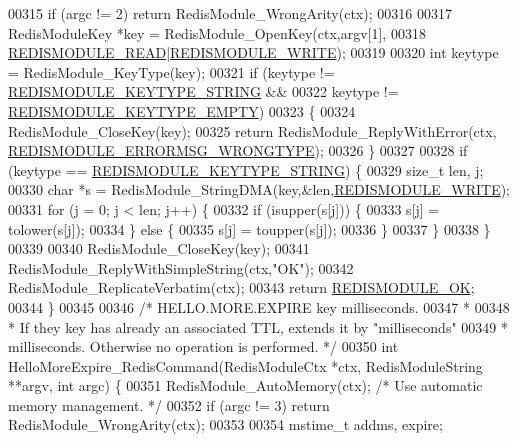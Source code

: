 \begin{DoxyCode}
00315     \textcolor{keywordflow}{if} (argc != 2) \textcolor{keywordflow}{return} RedisModule\_WrongArity(ctx);
00316 
00317     RedisModuleKey *key = RedisModule\_OpenKey(ctx,argv[1],
00318         \hyperlink{redismodule_8h_a369d2ff4bca768b05f826a12dd694825}{REDISMODULE\_READ}|\hyperlink{redismodule_8h_a73b37117ef94cb4a904361afcc51b6b4}{REDISMODULE\_WRITE});
00319 
00320     \textcolor{keywordtype}{int} keytype = RedisModule\_KeyType(key);
00321     \textcolor{keywordflow}{if} (keytype != \hyperlink{redismodule_8h_aa95428eed7110a77736ddbe0584aebbf}{REDISMODULE\_KEYTYPE\_STRING} &&
00322         keytype != \hyperlink{redismodule_8h_adf2819748eb5e89c621d2c9c65c0b5f7}{REDISMODULE\_KEYTYPE\_EMPTY})
00323     \{
00324         RedisModule\_CloseKey(key);
00325         \textcolor{keywordflow}{return} RedisModule\_ReplyWithError(ctx,
      \hyperlink{redismodule_8h_ab897689b0673a1e4cbc097cb5bce04c1}{REDISMODULE\_ERRORMSG\_WRONGTYPE});
00326     \}
00327 
00328     \textcolor{keywordflow}{if} (keytype == \hyperlink{redismodule_8h_aa95428eed7110a77736ddbe0584aebbf}{REDISMODULE\_KEYTYPE\_STRING}) \{
00329         size\_t len, j;
00330         \textcolor{keywordtype}{char} *s = RedisModule\_StringDMA(key,&len,\hyperlink{redismodule_8h_a73b37117ef94cb4a904361afcc51b6b4}{REDISMODULE\_WRITE});
00331         \textcolor{keywordflow}{for} (j = 0; j < len; j++) \{
00332             \textcolor{keywordflow}{if} (isupper(s[j])) \{
00333                 s[j] = tolower(s[j]);
00334             \} \textcolor{keywordflow}{else} \{
00335                 s[j] = toupper(s[j]);
00336             \}
00337         \}
00338     \}
00339 
00340     RedisModule\_CloseKey(key);
00341     RedisModule\_ReplyWithSimpleString(ctx,\textcolor{stringliteral}{"OK"});
00342     RedisModule\_ReplicateVerbatim(ctx);
00343     \textcolor{keywordflow}{return} \hyperlink{redismodule_8h_a1bc5bfd69abcd378ff52c640adc5418d}{REDISMODULE\_OK};
00344 \}
00345 
00346 \textcolor{comment}{/* HELLO.MORE.EXPIRE key milliseconds.}
00347 \textcolor{comment}{ *}
00348 \textcolor{comment}{ * If they key has already an associated TTL, extends it by "milliseconds"}
00349 \textcolor{comment}{ * milliseconds. Otherwise no operation is performed. */}
00350 \textcolor{keywordtype}{int} HelloMoreExpire\_RedisCommand(RedisModuleCtx *ctx, RedisModuleString **argv, \textcolor{keywordtype}{int} argc) \{
00351     RedisModule\_AutoMemory(ctx); \textcolor{comment}{/* Use automatic memory management. */}
00352     \textcolor{keywordflow}{if} (argc != 3) \textcolor{keywordflow}{return} RedisModule\_WrongArity(ctx);
00353 
00354     mstime\_t addms, expire;

\end{DoxyCode}
